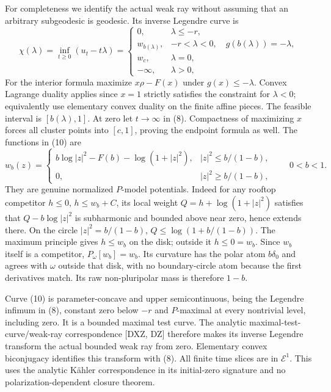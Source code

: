 \documentclass[11pt]{article}
\begin{document}
For completeness we identify the actual weak ray without assuming that
an arbitrary subgeodesic is geodesic. Its inverse Legendre curve is
\[
 \chi(\lambda)=\inf_{t\geq0}(u_t-t\lambda)=
 \begin{cases}
 0,&\lambda\leq-r,\\
 w_{b(\lambda)},&-r<\lambda<0,\quad g(b(\lambda))=-\lambda,\\
 w_c,&\lambda=0,\\
 -\infty,&\lambda>0,
 \end{cases}                                           \tag{10}
\]
For the interior formula maximize $x\rho-F(x)$ under $g(x)\leq-\lambda$.
Convex Lagrange duality applies since $x=1$ strictly satisfies the
constraint for $\lambda<0$; equivalently use elementary convex duality
on the finite affine pieces. The feasible interval is $[b(\lambda),1]$.
At zero let $t\to\infty$ in (8). Compactness of maximizing $x$ forces
all cluster points into $[c,1]$, proving the endpoint formula as well.
The functions in (10) are
\[
 w_b(z)=
 \begin{cases}
 b\log|z|^2-F(b)-\log(1+|z|^2),&|z|^2\leq b/(1-b),\\
 0,&|z|^2\geq b/(1-b),
 \end{cases}\qquad 0<b<1 .                             \tag{11}
\]
They are genuine normalized $P$-model potentials. Indeed for any rooftop
competitor $h\leq0$, $h\leq w_b+C$, its local weight
$Q=h+\log(1+|z|^2)$ satisfies that $Q-b\log|z|^2$ is subharmonic
and bounded above near zero, hence extends there. On the circle
$|z|^2=b/(1-b)$, $Q\leq\log(1+b/(1-b))$.
The maximum principle gives $h\leq w_b$ on the disk; outside it
$h\leq0=w_b$. Since $w_b$ itself is a competitor, $P_\omega[w_b]=w_b$.
Its curvature has the polar atom $b\delta_0$ and agrees with $\omega$
outside that disk, with no boundary-circle atom because the first
derivatives match. Its raw non-pluripolar mass is therefore $1-b$.

Curve (10) is parameter-concave and upper semicontinuous, being the
Legendre infimum in (8), constant zero below $-r$ and $P$-maximal at
every nontrivial level, including zero. It is a bounded maximal test
curve. The analytic maximal-test-curve/weak-ray correspondence [DXZ, DZ]
therefore makes its inverse Legendre transform the actual bounded
weak ray from zero. Elementary convex biconjugacy identifies this
transform with (8). All finite time slices are in $\mathcal E^1$.
This uses the analytic K\"ahler correspondence in its initial-zero
signature and no polarization-dependent closure theorem.
\end{document}
